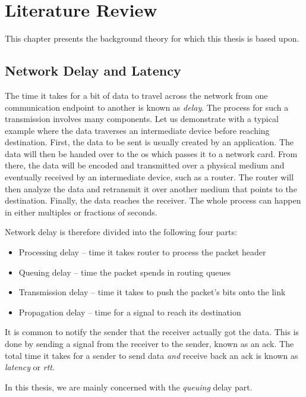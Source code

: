\chapter{Literature Review}

This chapter presents the background theory for which this thesis is based upon.


\section{Network Delay and Latency}

The time it takes for a bit of data to travel across the network from one communication endpoint to another is known as \textit{delay}. The process for such a transmission involves many components. Let us demonstrate with a typical example where the data traverses an intermediate device before reaching destination. First, the data to be sent is usually created by an application. The data will then be handed over to the \gls{os} which passes it to a network card. From there, the data will be encoded and transmitted over a physical medium and eventually received by an intermediate device, such as a router. The router will then analyze the data and retransmit it over another medium that points to the destination. Finally, the data reaches the receiver. The whole process can happen in either multiples or fractions of seconds.

Network delay is therefore divided into the following four parts:

\begin{itemize}
    \item Processing delay – time it takes router to process the packet header
    \item Queuing delay – time the packet spends in routing queues
    \item Transmission delay – time it takes to push the packet's bits onto the link
    \item Propagation delay – time for a signal to reach its destination
\end{itemize}

It is common to notify the sender that the receiver actually got the data. This is done by sending a signal from the receiver to the sender, known as an \gls{ack}. The total time it takes for a sender to send data \textit{and} receive back an \gls{ack} is known as \textit{latency} or \textit{rtt}.

In this thesis, we are mainly concerned with the \textit{queuing} delay part.


